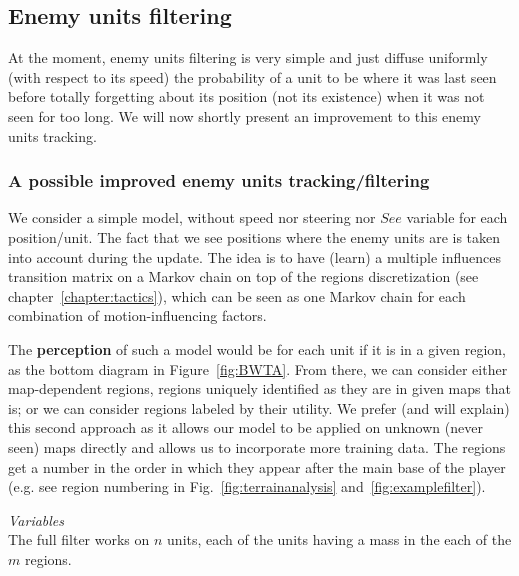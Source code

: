 \subsection{Enemy units filtering}

At the moment, enemy units filtering is very simple and just diffuse uniformly (with respect to its speed) the probability of a unit to be where it was last seen before totally forgetting about its position (not its existence) when it was not seen for too long. We will now shortly present an improvement to this enemy units tracking.

\subsubsection{A possible improved enemy units tracking/filtering}

\label{sec:enemyunitsfilter}
We consider a simple model, without speed nor steering nor $See$ variable for each position/unit. The fact that we see positions where the enemy units are is taken into account during the update.
The idea is to have (learn) a multiple influences transition matrix on a Markov chain on top of the regions discretization (see chapter~\ref{chapter:tactics}), which can be seen as one Markov chain for each combination of motion-influencing factors.

The \textbf{perception} of such a model would be for each unit if it is in a given region, as the bottom diagram in Figure~\ref{fig:BWTA}. From there, we can consider either map-dependent regions, regions uniquely identified as they are in given maps that is; or we can consider regions labeled by their utility. We prefer (and will explain) this second approach as it allows our model to be applied on unknown (never seen) maps directly and allows us to incorporate more training data. The regions get a number in the order in which they appear after the main base of the player (e.g. see region numbering in Fig.~\ref{fig:terrainanalysis} and~\ref{fig:examplefilter}). %

\vspace{0.3cm}
\textit{Variables}\\
The full filter works on $n$ units, each of the units having a mass in the each of the $m$ regions.

